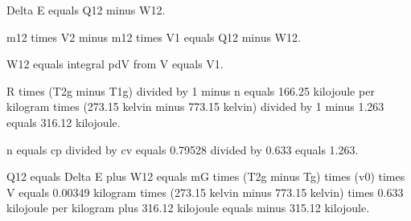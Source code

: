 Delta E equals Q12 minus W12.

m12 times V2 minus m12 times V1 equals Q12 minus W12.

W12 equals integral pdV from V equals V1.

R times (T2g minus T1g) divided by 1 minus n equals 166.25 kilojoule per kilogram times (273.15 kelvin minus 773.15 kelvin) divided by 1 minus 1.263 equals 316.12 kilojoule.

n equals cp divided by cv equals 0.79528 divided by 0.633 equals 1.263.

Q12 equals Delta E plus W12 equals mG times (T2g minus Tg) times (v0) times V equals 0.00349 kilogram times (273.15 kelvin minus 773.15 kelvin) times 0.633 kilojoule per kilogram plus 316.12 kilojoule equals minus 315.12 kilojoule.